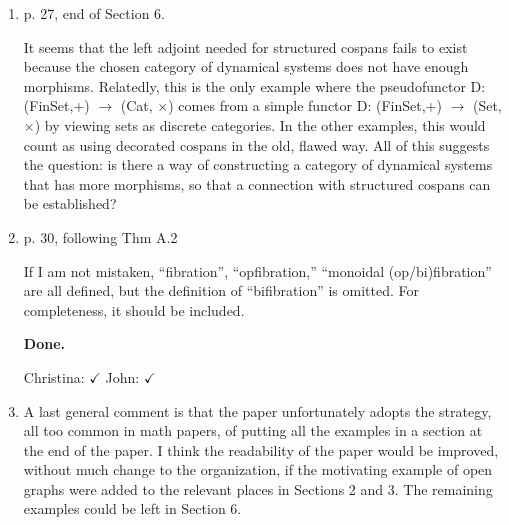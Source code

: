 \documentclass[reqno]{amsart}
\def\chris{\color{purple} Christina: }
\def\john{\color{red} John: }
\def\kenny{\color{blue} Kenny: }
\begin{document}
\begin{enumerate}
{\bf At the beginning of Section 6.1, as well as in Sections 6.2 and 6.3, we now use $f$ as a map between vertices and $g$ as a map 
between edges.} 

{\chris $\checkmark$} {\john $\checkmark$}

{\chris Added a few more places where Kenny spotted these mistakes.}

\iffalse
{\kenny I \emph{think} they are complaining that we use $f$ as a map of vertices and $g$ as a map of edges when we're talking about the functor $F \colon \mathsf{Set} \to \mathsf{Cat}$ on page 21, but we use $g$ as a map of vertices and $f$ as a map of edges in the two squares at the start of Section 6.1 on the previous page?}

{\john That sounds plausible.  Unless there's a damn good reason let's use $f$ as a map for vertices and $g$ as a map for edges, since ``vertices come 
before edges'' - morally the first are 0-cells, the second are 1-cells.}

{\chris I see. Fixed, and see above.}
\fi

\item p. 27, end of Section 6.

It seems that the left adjoint needed for structured cospans fails to exist because the chosen category of dynamical systems does not have enough 
morphisms. Relatedly, this is the only example where the pseudofunctor D: (FinSet,+) $\to$ (Cat, $\times$) comes from a simple functor D: (FinSet,+) 
$\to$ (Set, $\times$) by viewing sets as discrete categories. In the other examples, this would count as using decorated cospans in the old, flawed 
way. 
All of this suggests the question: is there a way of constructing a category of dynamical systems that has more morphisms, so that a connection with 
structured cospans can be established?

\item p. 30, following Thm A.2

If I am not mistaken, “fibration”, “opfibration,” “monoidal (op/bi)fibration” are all defined, but the definition of “bifibration” is omitted. For 
completeness, it should be included.

{\bf Done.} 

{\chris $\checkmark$} {\john $\checkmark$} 

\item A last general comment is that the paper unfortunately adopts the strategy, all too common in math papers, of putting all the examples in a 
section at 
the end of the paper. I think the readability of the paper would be improved, without much change to the organization, if the motivating example of 
open graphs were added to the relevant places in Sections 2 and 3. The remaining examples could be left in Section 6.


\end{enumerate}
\end{document}
